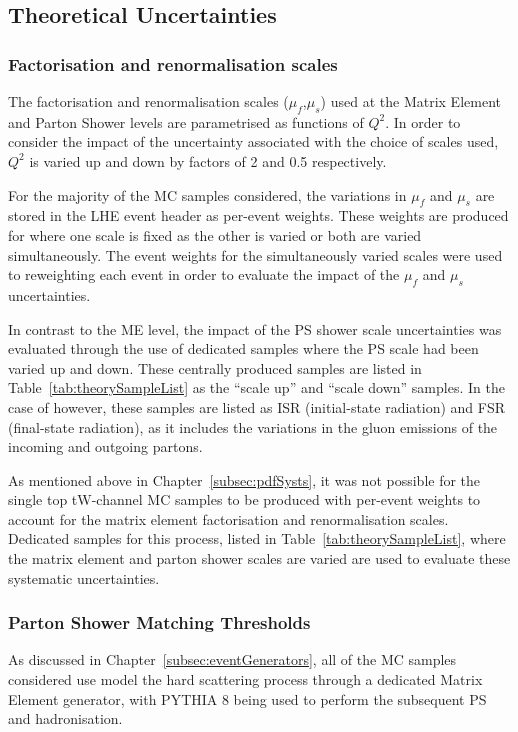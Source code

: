 \subsection{Theoretical Uncertainties}\label{sec:theorySysts}

\subsubsection{Factorisation and renormalisation scales}
The factorisation and renormalisation scales ($\mu_{f}$,$\mu_{s}$) used at the Matrix Element and Parton Shower levels are parametrised as functions of $Q^{2}$.
In order to consider the impact of the uncertainty associated with the choice of scales used, $Q^{2}$ is varied up and down by factors of 2 and 0.5 respectively.

For the majority of the MC samples considered, the variations in $\mu_{f}$ and $\mu_{s}$ are stored in the LHE event header as per-event weights.
These weights are produced for where one scale is fixed as the other is varied or both are varied simultaneously.
The event weights for the simultaneously varied scales were used to reweighting each event in order to evaluate the impact of the $\mu_{f}$ and $\mu_{s}$ uncertainties.

In contrast to the ME level, the impact of the PS shower scale uncertainties was evaluated through the use of dedicated samples where the PS scale had been varied up and down.
These centrally produced samples are listed in Table~\ref{tab:theorySampleList} as the ``scale up'' and ``scale down'' samples.
In the case of \ttbar however, these samples are listed as ISR (initial-state radiation) and FSR (final-state radiation), as it includes the variations in the gluon emissions of the incoming and outgoing partons.

As mentioned above in Chapter~\ref{subsec:pdfSysts}, it was not possible for the single top tW-channel MC samples to be produced with per-event weights to account for the matrix element factorisation and renormalisation scales.
Dedicated samples for this process, listed in Table~\ref{tab:theorySampleList}, where the matrix element and parton shower scales are varied are used to evaluate these systematic uncertainties.

\subsubsection{Parton Shower Matching Thresholds}
As discussed in Chapter~\ref{subsec:eventGenerators}, all of the MC samples considered use model the hard scattering process through a dedicated Matrix Element generator, with PYTHIA 8 being used to perform the subsequent PS and hadronisation.

